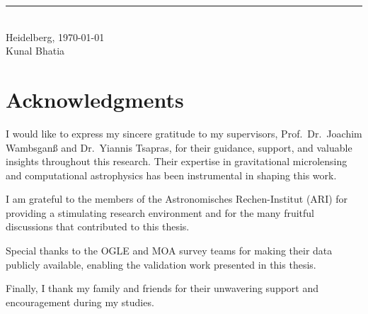\documentclass[
     12pt,         %
     a4paper,      %
     BCOR=10mm,    %
     DIV=14,       %
     twoside,      %
     openright,    %
     listof=totoc, %
     bibliography=totoc, %
     ]{scrreprt}
\begin{document}
\vspace{3cm}

\noindent
\rule{6cm}{0.4pt}\\
Heidelberg, \today\\
Kunal Bhatia

\cleardoublepage





\thispagestyle{empty}

\vspace*{50pt}

\section*{Acknowledgments}

I would like to express my sincere gratitude to my supervisors, Prof.~Dr.~Joachim Wambsganß and Dr.~Yiannis Tsapras, for their guidance, support, and valuable insights throughout this research. Their expertise in gravitational microlensing and computational astrophysics has been instrumental in shaping this work.

I am grateful to the members of the Astronomisches Rechen-Institut (ARI) for providing a stimulating research environment and for the many fruitful discussions that contributed to this thesis.

Special thanks to the OGLE and MOA survey teams for making their data publicly available, enabling the validation work presented in this thesis.

Finally, I thank my family and friends for their unwavering support and encouragement during my studies.

\cleardoublepage


\tableofcontents
\cleardoublepage

\listoffigures
\cleardoublepage

\listoftables
\cleardoublepage

\end{document}
